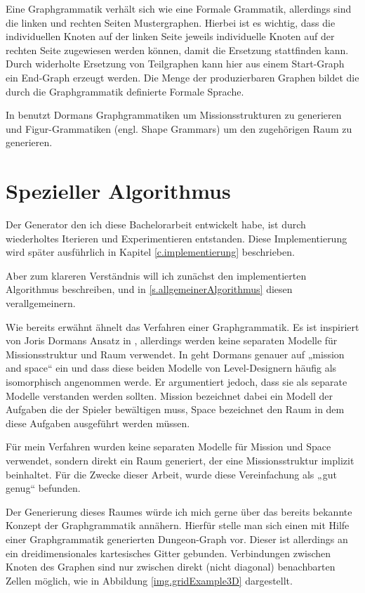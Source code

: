 Eine Graphgrammatik verhält sich wie eine Formale Grammatik, allerdings sind die linken und rechten Seiten Mustergraphen. Hierbei ist es wichtig, dass die individuellen Knoten auf der linken Seite jeweils individuelle Knoten auf der rechten Seite zugewiesen werden können, damit die Ersetzung stattfinden kann. 
\cite[Kap.~5.5.1, S.~80]{shaker2016procedural}
Durch widerholte Ersetzung von Teilgraphen kann hier aus einem Start-Graph ein End-Graph erzeugt werden. Die Menge der produzierbaren Graphen bildet die durch die Graphgrammatik definierte Formale Sprache. 

In \cite{dormansAdventures} benutzt Dormans Graphgrammatiken um Missionsstrukturen zu generieren und Figur-Grammatiken (engl. Shape Grammars) um den zugehörigen Raum zu generieren.

\section{Spezieller Algorithmus}\label{s.speziellerAlgorithmus}

Der Generator den ich diese Bachelorarbeit entwickelt habe, ist durch wiederholtes Iterieren und Experimentieren entstanden. Diese Implementierung wird später ausführlich in Kapitel \ref{c.implementierung} beschrieben.

Aber zum klareren Verständnis will ich zunächst den implementierten Algorithmus beschreiben, und in 
\ref{s.allgemeinerAlgorithmus} diesen verallgemeinern.

Wie bereits erwähnt ähnelt das Verfahren einer Graphgrammatik. Es ist inspiriert von Joris Dormans Ansatz in 
\cite{dormansAdventures},
allerdings werden keine separaten Modelle für Missionsstruktur und Raum verwendet.
In \cite{dormansModelTransformation} geht Dormans genauer auf „mission and space“ ein und dass diese beiden Modelle von Level-Designern häufig als isomorphisch angenommen werde. Er argumentiert jedoch, dass sie als separate Modelle verstanden werden sollten. Mission bezeichnet dabei ein Modell der Aufgaben die der Spieler bewältigen muss, Space bezeichnet den Raum in dem diese Aufgaben ausgeführt werden müssen.

Für mein Verfahren wurden keine separaten Modelle für Mission und Space verwendet, sondern direkt ein Raum generiert, der eine Missionsstruktur implizit beinhaltet. Für die Zwecke dieser Arbeit, wurde diese Vereinfachung als „gut genug“ befunden.

Der Generierung dieses Raumes würde ich mich gerne über das bereits bekannte Konzept der Graphgrammatik annähern. Hierfür stelle man sich einen mit Hilfe einer Graphgrammatik generierten Dungeon-Graph vor. Dieser ist allerdings an ein dreidimensionales kartesisches Gitter gebunden. Verbindungen zwischen Knoten des Graphen sind nur zwischen direkt (nicht diagonal) benachbarten Zellen möglich, wie in Abbildung \ref{img.gridExample3D} dargestellt.

